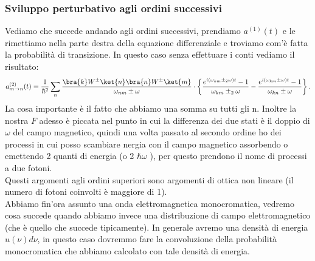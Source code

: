 \subsubsection{Sviluppo perturbativo agli ordini successivi}%
Vediamo che succede andando agli ordini successivi, prendiamo $a^{(1)}(t)$ e le rimettiamo nella parte destra della equazione differenziale e troviamo com'è fatta la probabilità di transizione. In questo caso senza effettuare i conti vediamo il risultato:
\[
    a^{(2)}_{m\to n}(t) =
    \frac{1}{\hbar ^2} \sum_{n}^{} 
    \frac{\bra{k}W^{\pm}\ket{n} \bra{n}W^{\pm} \ket{m}}{\omega_{nm}\pm \omega}
    \cdot 
    \left\{
	\frac{e^{i(\omega_{km}\pm_2\omega)t}-1}{\omega_{km}\pm_2\omega}
    - \frac{e^{i(\omega_{km}\pm \omega)t}-1}{\omega_{kn}\pm\omega}\right\}
.\] 
La cosa importante è il fatto che abbiamo una somma su tutti gli n. Inoltre la nostra $F$ adesso è piccata nel punto in cui la differenza dei due stati è il doppio di $\omega$ del campo magnetico, quindi una volta passato al secondo ordine ho dei processi in cui posso scambiare nergia con il campo magnetico assorbendo o emettendo 2 quanti di energia (o 2 $\hbar \omega$ ), per questo prendono il nome di processi a due fotoni.\\
Questi argomenti agli ordini superiori sono argomenti di ottica non lineare (il numero di fotoni coinvolti è maggiore di 1).\\
Abbiamo fin'ora assunto una onda elettromagnetica monocromatica, vedremo cosa succede quando abbiamo invece una distribuzione di campo elettromagnetico (che è quello che succede tipicamente). In generale avremo una densità di energia $u(\nu)d\nu$, in questo caso dovremmo fare la convoluzione della probabilità monocromatica che abbiamo calcolato con tale densità di energia.
